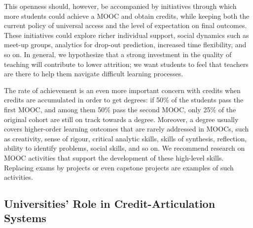 This openness should, however, be accompanied by initiatives through which more students
could achieve a MOOC and obtain credits, while keeping both the current
policy of universal access and the level of expectation on final outcomes. 
These initiatives could explore richer
individual support, social dynamics such as meet-up groups, analytics for
drop-out prediction, increased time flexibility, and so on. In general, we
hypothesize that a strong investment in the quality of teaching will
contribute to lower attrition; we want students to feel that teachers
are there to help them navigate difficult learning processes. 

The rate of achievement is an even more important concern with
credits when credits are  accumulated in order to get degrees:
if 50\% of the students pass the first MOOC, and among them 50\%
pass the second MOOC, only 25\% of the original cohort are still on
track towards a degree. Moreover, a degree usually covers
higher-order learning outcomes that are rarely addressed in MOOCs, such
as creativity, sense of rigour, critical
analytic skills, skills of synthesis, reflection, ability to identify
problems, social skills, and so on. We
recommend research on MOOC activities that support the development of
these high-level skills. Replacing exams by projects or even capstone
projects are examples of such activities.


\subsection{Universities' Role in Credit-Articulation Systems}

